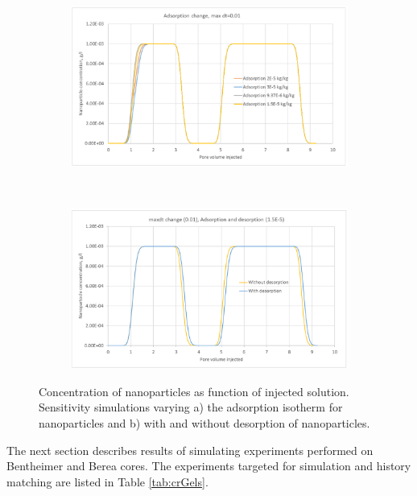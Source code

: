 \begin{figure}[h] %
    \begin{subfigure}{\textwidth}
    \centering
    \includegraphics[width=\textwidth]{img/cht/simNPconcA.png}
    \caption{}
    \label{cht:simNPconcA}
    \end{subfigure}
    \\
    \begin{subfigure}{\textwidth}
    \centering
    \includegraphics[width=\textwidth]{img/cht/simNPconcB.png}
    \caption{}
    \label{cht:simNPconcB}
    \end{subfigure}
    
    \caption{Concentration of nanoparticles as function of injected solution. Sensitivity simulations varying a) the adsorption isotherm for nanoparticles and b) with and without desorption of nanoparticles.}
    \label{cht:simNPconc}
\end{figure}

The next section describes results of simulating experiments performed on Bentheimer and Berea cores. The experiments targeted for simulation and history matching are listed in Table \ref{tab:crGels}.

